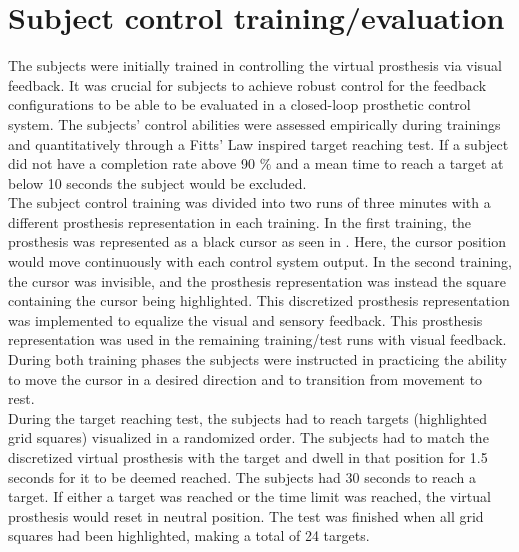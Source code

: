 \section{Subject control training/evaluation} \label{sec:pa:subjectcontrol}
The subjects were initially trained in controlling the virtual prosthesis via visual feedback. It was crucial for subjects to achieve robust control for the feedback configurations to be able to be evaluated in a closed-loop prosthetic control system. The subjects' control abilities were assessed empirically during trainings and quantitatively through a Fitts' Law inspired target reaching test. If a subject did not have a completion rate above 90 $\percent$ and a mean time to reach a target at below 10 seconds the subject would be excluded. \\
The subject control training was divided into two runs of three minutes with a different prosthesis representation in each training. In the first training, the prosthesis was represented as a black cursor as seen in . Here, the cursor position would move continuously with each control system output. In the second training, the cursor was invisible, and the prosthesis representation was instead the square containing the cursor being highlighted. This discretized prosthesis representation was implemented to equalize the visual and sensory feedback. This prosthesis representation was used in the remaining training/test runs with visual feedback. During both training phases the subjects were instructed in practicing the ability to move the cursor in a desired direction and to transition from movement to rest. \\
During the target reaching test, the subjects had to reach targets (highlighted grid squares) visualized in a randomized order. The subjects had to match the discretized virtual prosthesis with the target and dwell in that position for 1.5 seconds for it to be deemed reached. The subjects had 30 seconds to reach a target. If either a target was reached or the time limit was reached, the virtual prosthesis would reset in neutral position. The test was finished when all grid squares had been highlighted, making a total of 24 targets. 